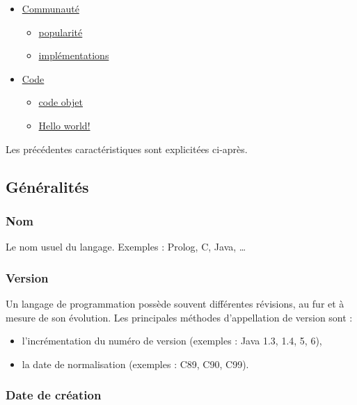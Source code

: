 \begin{itemize}
\begin{itemize}
	\end{itemize}
\item \hyperref[communaute]{Communauté}
	\begin{itemize}
	\item \hyperref[popularite]{popularité}
	\item \hyperref[implementations]{implémentations}\\
	\end{itemize}
\item \hyperref[code]{Code}
	\begin{itemize}
	\item \hyperref[objet]{code objet}
	\item \hyperref[hello]{Hello world!}\\
	\end{itemize}
\end{itemize}
\renewcommand{\labelitemi}{\normalfont\bfseries\textendash}

Les précédentes caractéristiques sont explicitées ci-après.

\subsection{Généralités}
\label{generalites}

\subsubsection{Nom}
\label{nom}

Le nom usuel du langage. Exemples : Prolog, C, Java, …

\subsubsection{Version}
\label{version}

Un langage de programmation possède souvent différentes révisions, au fur et à mesure de son évolution. Les principales méthodes d'appellation de version sont :
\begin{itemize}
\item l'incrémentation du numéro de version (exemples : Java 1.3, 1.4, 5, 6),
\item la date de normalisation (exemples : C89, C90, C99).
\end{itemize}

\subsubsection{Date de création}
\label{date_creation}


